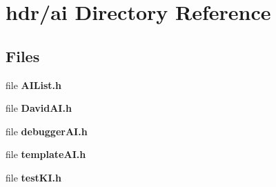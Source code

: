 \section{hdr/ai Directory Reference}
\label{dir_04cf6b94e5f246ace4dcca20476db399}
\subsection*{Files}
\begin{DoxyCompactItemize}
\item 
file {\bfseries A\-I\-List.\-h}
\item 
file {\bfseries David\-A\-I.\-h}
\item 
file {\bfseries debugger\-A\-I.\-h}
\item 
file {\bfseries template\-A\-I.\-h}
\item 
file {\bfseries test\-K\-I.\-h}
\end{DoxyCompactItemize}
